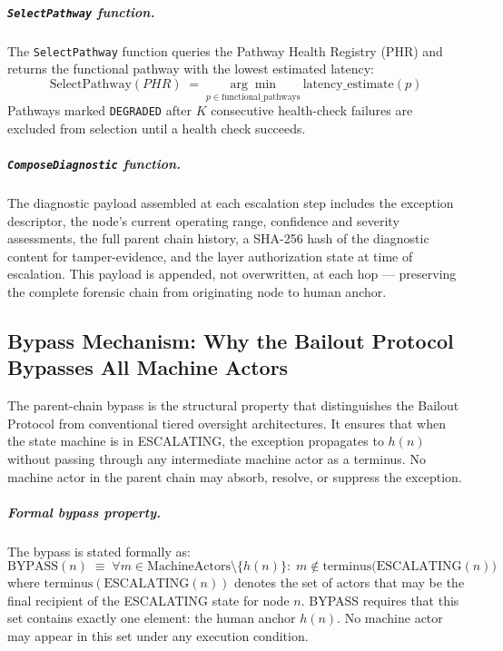 \subparagraph{\texttt{SelectPathway} function.} The \texttt{SelectPathway} function queries the Pathway Health Registry (PHR) and returns the functional pathway with the lowest estimated latency:
\begin{equation}
\text{SelectPathway}(PHR) \;=\; \underset{p \in \text{functional\_pathways}}{\arg\min}\ \text{latency\_estimate}(p) \tag{SP}
\end{equation}
Pathways marked \texttt{DEGRADED} after $K$ consecutive health-check failures are excluded from selection until a health check succeeds.

\subparagraph{\texttt{ComposeDiagnostic} function.} The diagnostic payload assembled at each escalation step includes the exception descriptor, the node's current operating range, confidence and severity assessments, the full parent chain history, a SHA-256 hash of the diagnostic content for tamper-evidence, and the \fact{} layer authorization state at time of escalation. This payload is appended, not overwritten, at each hop — preserving the complete forensic chain from originating node to human anchor.

\subsection{Bypass Mechanism: Why the Bailout Protocol Bypasses All Machine Actors}\label{sec:bypass-mechanism}

The parent-chain bypass is the structural property that distinguishes the Bailout Protocol from conventional tiered oversight architectures. It ensures that when the state machine is in ESCALATING, the exception propagates to $h(n)$ without passing through any intermediate machine actor as a terminus. No machine actor in the parent chain may absorb, resolve, or suppress the exception.

\subparagraph{Formal bypass property.} The bypass is stated formally as:
\begin{equation}
\text{BYPASS}(n) \;\equiv\; \forall m \in \text{MachineActors} \setminus \{h(n)\}:\; m \notin \text{terminus}\bigl(\text{ESCALATING}(n)\bigr) \tag{BP}\label{eq:bypass-property}
\end{equation}
where $\text{terminus}(\text{ESCALATING}(n))$ denotes the set of actors that may be the final recipient of the ESCALATING state for node $n$. BYPASS requires that this set contains exactly one element: the human anchor $h(n)$. No machine actor may appear in this set under any execution condition.

